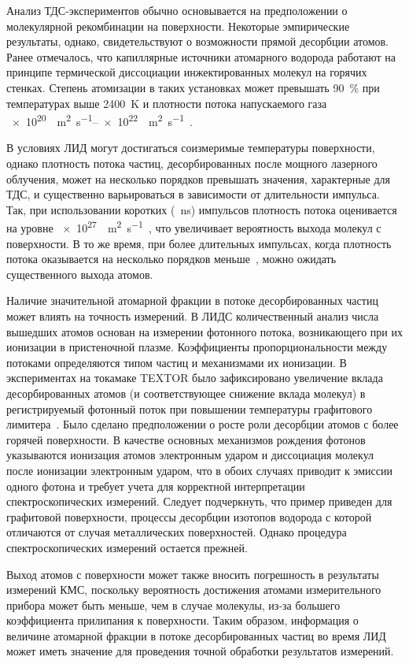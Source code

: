Анализ ТДС-экспериментов обычно основывается на предположении о молекулярной рекомбинации на поверхности. Некоторые эмпирические результаты, однако, свидетельствуют о возможности прямой десорбции атомов. Ранее отмечалось, что капиллярные источники атомарного водорода работают на принципе термической диссоциации инжектированных молекул на горячих стенках. Степень атомизации в таких установках может превышать \SI{90}{\percent} при температурах выше \SI{2400}{\kelvin} и плотности потока напускаемого газа \SIrange{e20}{e22}{\per\meter\squared\per\second}~\cite{Tschersich2000,Tschersich2008}.

В условиях ЛИД могут достигаться соизмеримые температуры поверхности, однако плотность потока частиц, десорбированных после мощного лазерного облучения, может на несколько порядков превышать значения, характерные для ТДС, и существенно варьироваться в зависимости от длительности импульса. Так, при использовании коротких (\SI{}{\nano\second}) импульсов плотность потока оценивается на уровне \SI{e27}{\per\meter\squared\per\second}~\cite{Gasparyan2021}, что увеличивает вероятность выхода молекул с поверхности. В то же время, при более длительных импульсах, когда плотность потока оказывается на несколько порядков меньше~\cite{Yu2019}, можно ожидать существенного выхода атомов.

Наличие значительной атомарной фракции в потоке десорбированных частиц может влиять на точность измерений. В ЛИДС количественный анализ числа вышедших атомов основан на измерении фотонного потока, возникающего при их ионизации в пристеночной плазме. Коэффициенты пропорциональности между потоками определяются типом частиц и механизмами их ионизации. В экспериментах на токамаке TEXTOR было зафиксировано увеличение вклада десорбированных атомов (и соответствующее снижение вклада молекул) в регистрируемый фотонный поток при повышении температуры графитового лимитера~\cite{Brezinsek2005}. Было сделано предположении о росте роли десорбции атомов с более горячей поверхности. В качестве основных механизмов рождения фотонов указываются ионизация атомов электронным ударом и диссоциация молекул после ионизации электронным ударом, что в обоих случаях приводит к эмиссии одного фотона и требует учета для корректной интерпретации спектроскопических измерений. Следует подчеркнуть, что пример приведен для графитовой поверхности, процессы десорбции изотопов водорода с которой отличаются от случая металлических поверхностей. Однако процедура спектроскопических измерений остается прежней.

Выход атомов с поверхности может также вносить погрешность в результаты измерений КМС, поскольку вероятность достижения атомами измерительного прибора может быть меньше, чем в случае молекулы, из-за большего коэффициента прилипания к поверхности. Таким образом, информация о величине атомарной фракции в потоке десорбированных частиц во время ЛИД может иметь значение для проведения точной обработки результатов измерений.

